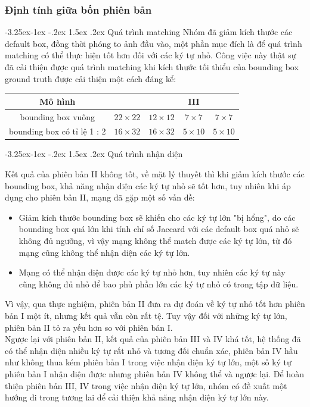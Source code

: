 \documentclass[a4paper,12pt]{article}
\makeatletter
\newcounter {subsubsubsection}[subsubsection]
\newcommand\subsubsubsection{\@startsection{subsubsubsection}{4}{\z@}%
	{-3.25ex\@plus -1ex \@minus -.2ex}%
	{1.5ex \@plus .2ex}%
	{\normalfont\normalsize\bfseries}}
\makeatother
\begin{document}
	
	\subsubsection{Định tính giữa bốn phiên bản}
	\subsubsubsection{Quá trình matching}
	Nhóm đã giảm kích thước các default box, đồng thời phóng to ảnh đầu vào, một phần mục đích là để quá trình matching có thể thực hiện tốt hơn đối với các ký tự nhỏ. Công việc này thật sự đã cải thiện được quá trình matching khi kích thước tối thiểu của bounding box ground truth được cải thiện một cách đáng kể:
	
	\begin{center}
		\begin{tabular}{||c | c | c | c | c||} 
			\hline
			Mô hình & \makecell{  I } & \makecell{ II} & III &  \makecell{ IV}  \\ [0.5ex] 
			\hline
			bounding box vuông & $22 \times 22$ & $12 \times 12$ & $7 \times 7$ & $7 \times 7$ \\
			\hline
			bounding box có tỉ lệ 1 : 2 & $16 \times 32$ & $16 \times 32$ & $5 \times 10$ & $5 \times 10$ \\
			\hline
		\end{tabular}
	\end{center}
	
	\subsubsubsection{Quá trình nhận diện}
	
	Kết quả của phiên bản II không tốt, về mặt lý thuyết thì khi giảm kích thước các bounding box, khả năng nhận diện các ký tự nhỏ sẽ tốt hơn, tuy nhiên khi áp dụng cho phiên bản II, mạng đã gặp một số vấn đề: 
	
	\begin{itemize}
		\item Giảm kích thước bounding box sẽ khiến cho các ký tự lớn "bị hổng", do các bounding box quá lớn khi tính chỉ số Jaccard\cite{Jaccard} với các default box quá nhỏ sẽ không đủ ngưỡng, vì vậy mạng không thể match được các ký tự lớn, từ đó mạng cũng không thể nhận diện các ký tự lớn.
		\item Mạng có thể nhận diện được các ký tự nhỏ hơn, tuy nhiên các ký tự này cũng không đủ nhỏ để bao phủ phần lớn các ký tự nhỏ có trong tập dữ liệu.
	\end{itemize}
	Vì vậy, qua thực nghiệm, phiên bản II đưa ra dự đoán về ký tự nhỏ tốt hơn phiên bản I một ít, nhưng kết quả vẫn còn rất tệ. Tuy vậy đối với những ký tự lớn, phiên bản II tỏ ra yếu hơn so với phiên bản I.\\
	Ngược lại với phiên bản II, kết quả của phiên bản III và IV khá tốt, hệ thống đã có thể nhận diện nhiều ký tự rất nhỏ và tương đối chuẩn xác, phiên bản IV hầu như không thua kém phiên bản I trong việc nhận diện ký tự lớn, một số ký tự phiên bản I nhận diện được nhưng phiên bản IV không thể và ngược lại. Để hoàn thiện phiên bản III, IV trong việc nhận diện ký tự lớn, nhóm có đề xuất một hướng đi trong tương lai để cải thiện khả năng nhận diện ký tự lớn này.\\
	
\end{document}
